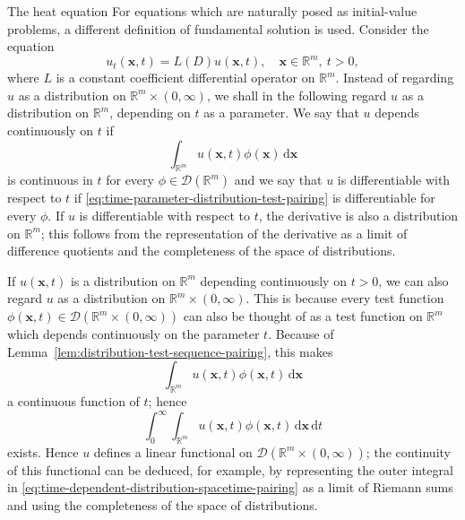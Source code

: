 \begin{Example}{The heat equation}
\label{ex:heat-fundamental-solution}
For equations which are naturally posed as initial-value problems, a different definition of fundamental solution is used. Consider the equation
\begin{equation}\label{eq:first-order-time-evolution-fundamental-equation}
u_t(\bm{x},t)=L(D)u(\bm{x},t),\quad\bm{x}\in\mathbb{R}^m,\ t>0,
\end{equation}
where $L$ is a constant coefficient differential operator on $\mathbb{R}^m$. Instead of regarding $u$ as a distribution on $\mathbb{R}^m\times(0,\infty)$, we shall in the following regard $u$ as a distribution on $\mathbb{R}^m$, depending on $t$ as a parameter. We say that $u$ depends continuously on $t$ if
\begin{equation}\label{eq:time-parameter-distribution-test-pairing}
\int_{\mathbb{R}^m}u(\bm{x},t)\phi(\bm{x})\,\mathrm{d}\bm{x}
\end{equation}
is continuous in $t$ for every $\phi\in\mathcal{D}(\mathbb{R}^m)$ and we say that $u$ is differentiable with respect to $t$ if \eqref{eq:time-parameter-distribution-test-pairing} is differentiable for every $\phi$. If $u$ is differentiable with respect to $t$, the derivative is also a distribution on $\mathbb{R}^m$; this follows from the representation of the derivative as a limit of difference quotients and the completeness of the space of distributions.
\end{Example}

If $u(\bm{x},t)$ is a distribution on $\mathbb{R}^m$ depending continuously on $t>0$, we can also regard $u$ as a distribution on $\mathbb{R}^m\times(0,\infty)$. This is because every test function $\phi(\bm{x},t)\in\mathcal{D}(\mathbb{R}^m\times(0,\infty))$ can also be thought of as a test function on $\mathbb{R}^m$ which depends continuously on the parameter $t$. Because of Lemma~\ref{lem:distribution-test-sequence-pairing}, this makes
\begin{equation}\label{eq:time-dependent-test-distribution-pairing}
\int_{\mathbb{R}^m}u(\bm{x},t)\phi(\bm{x},t)\,\mathrm{d}\bm{x}
\end{equation}
a continuous function of $t$; hence
\begin{equation}\label{eq:time-dependent-distribution-spacetime-pairing}
\int_0^\infty\int_{\mathbb{R}^m}u(\bm{x},t)\phi(\bm{x},t)\,\mathrm{d}\bm{x}\,\mathrm{d}t
\end{equation}
exists. Hence $u$ defines a linear functional on $\mathcal{D}(\mathbb{R}^m\times(0,\infty))$; the continuity of this functional can be deduced, for example, by representing the outer integral in \eqref{eq:time-dependent-distribution-spacetime-pairing} as a limit of Riemann sums and using the completeness of the space of distributions.

